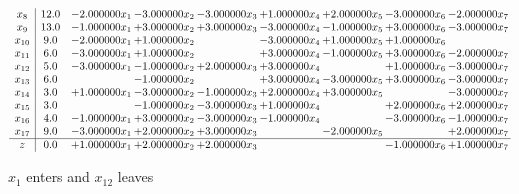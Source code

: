 \documentclass[10pt]{article}
\begin{document}
\[\begin{array}{c| c c@{\hskip 2pt} c@{\hskip 2pt} c@{\hskip 2pt} c@{\hskip 2pt} c@{\hskip 2pt} c@{\hskip 2pt} c@{\hskip 2pt} }
 x_{8}   &  12.0 & -2.000000 x_{1} & -3.000000 x_{2} & -3.000000 x_{3} & + 1.000000 x_{4} & + 2.000000 x_{5} & -3.000000 x_{6} & -2.000000 x_{7}\\
 x_{9}   &  13.0 & -1.000000 x_{1} & + 3.000000 x_{2} & + 3.000000 x_{3} & -3.000000 x_{4} & -1.000000 x_{5} & + 3.000000 x_{6} & -3.000000 x_{7}\\
 x_{10}   &  9.0 & -2.000000 x_{1} & + 1.000000 x_{2} &   & -3.000000 x_{4} & + 1.000000 x_{5} & + 1.000000 x_{6} &   \\
 x_{11}   &  6.0 & -3.000000 x_{1} & + 1.000000 x_{2} &   & + 3.000000 x_{4} & -1.000000 x_{5} & + 3.000000 x_{6} & -2.000000 x_{7}\\
 x_{12}   &  5.0 & -3.000000 x_{1} & -1.000000 x_{2} & + 2.000000 x_{3} & + 3.000000 x_{4} &   & + 1.000000 x_{6} & -3.000000 x_{7}\\
 x_{13}   &  6.0  &   & -1.000000 x_{2} &   & + 3.000000 x_{4} & -3.000000 x_{5} & + 3.000000 x_{6} & -3.000000 x_{7}\\
 x_{14}   &  3.0 & + 1.000000 x_{1} & -3.000000 x_{2} & -1.000000 x_{3} & + 2.000000 x_{4} & + 3.000000 x_{5} &   & -3.000000 x_{7}\\
 x_{15}   &  3.0  &   & -1.000000 x_{2} & -3.000000 x_{3} & + 1.000000 x_{4} &   & + 2.000000 x_{6} & + 2.000000 x_{7}\\
 x_{16}   &  4.0 & -1.000000 x_{1} & + 3.000000 x_{2} & -3.000000 x_{3} & -1.000000 x_{4} &   & -3.000000 x_{6} & -1.000000 x_{7}\\
 x_{17}   &  9.0 & -3.000000 x_{1} & + 2.000000 x_{2} & + 3.000000 x_{3} &   & -2.000000 x_{5} &   & + 2.000000 x_{7}\\
\hline
z    &  0.0 & + 1.000000 x_{1} & + 2.000000 x_{2} & + 2.000000 x_{3} &    &   & -1.000000 x_{6} & + 1.000000 x_{7}\\
\end{array}\]


 $ x_{1} $ enters and $ x_{12} $ leaves 
\end{document}
